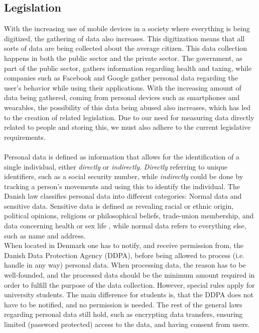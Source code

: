 
\subsection{Legislation}
\label{sub:legislation}

With the increasing use of mobile devices in a society where everything is being digitized, the gathering of data also increases. This digitization means that all sorts of data are being collected about the average citizen. This data collection happens in both the public sector and the private sector. The government, as part of the public sector, gathers information regarding health and taxing, while companies such as Facebook and Google gather personal data regarding the user's behavior while using their applications. With the increasing amount of data being gathered, coming from personal devices such as smartphones and wearables, the possibility of this data being abused also increases, which has led to the creation of related legislation. Due to our need for measuring data directly related to people and storing this, we must also adhere to the current legislative requirements. 
\\\\
Personal data is defined as information that allows for the identification of a single individual, either \emph{directly} or \emph{indirectly}. \emph{Directly} referring to unique identifiers, such as a social security number, while \emph{indirectly} could be done by tracking a person's movements and using this to identify the individual. The Danish law classifies personal data into different categories: Normal data and sensitive data. Sensitive data is defined as revealing racial or ethnic origin, political opinions, religious or philosophical beliefs, trade-union membership, and data concerning health or sex life \parencite{datatilsynet_stud1}, while normal data refers to everything else, such as name and address.
\\
When located in Denmark one has to notify, and receive permission from, the Danish Data Protection Agency (DDPA), before being allowed to process (i.e. handle in any way) personal data. When processing data, the reason has to be well-founded, and the processed data should be the minimum amount required in order to fulfill the purpose of the data collection. However, special rules apply for university students. The main difference for students is, that the DDPA does not have to be notified, and no permission is needed. The rest of the general laws regarding personal data still hold, such as encrypting data transfers, ensuring limited (password protected) access to the data, and having consent from users. 
